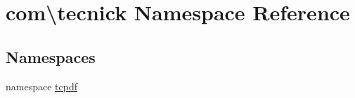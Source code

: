 \hypertarget{namespacecom_1_1tecnick}{\section{com\textbackslash{}tecnick Namespace Reference}
\label{namespacecom_1_1tecnick}
}
\subsection*{Namespaces}
\begin{DoxyCompactItemize}
\item 
namespace \hyperlink{namespacecom_1_1tecnick_1_1tcpdf}{tcpdf}
\end{DoxyCompactItemize}
